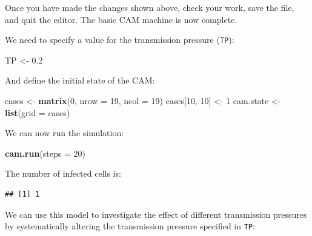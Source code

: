 \documentclass[12pt,a4paper]{book}
\newenvironment{Shaded}{\begin{snugshade}}{\end{snugshade}}
\newcommand{\KeywordTok}[1]{\textcolor[rgb]{0.13,0.29,0.53}{\textbf{#1}}}
\newcommand{\DataTypeTok}[1]{\textcolor[rgb]{0.13,0.29,0.53}{#1}}
\newcommand{\DecValTok}[1]{\textcolor[rgb]{0.00,0.00,0.81}{#1}}
\newcommand{\FloatTok}[1]{\textcolor[rgb]{0.00,0.00,0.81}{#1}}
\newcommand{\StringTok}[1]{\textcolor[rgb]{0.31,0.60,0.02}{#1}}
\newcommand{\OperatorTok}[1]{\textcolor[rgb]{0.81,0.36,0.00}{\textbf{#1}}}
\newcommand{\NormalTok}[1]{#1}
\theoremstyle{definition}
\theoremstyle{definition}
\theoremstyle{definition}
\theoremstyle{remark}
\begin{document}
Once you have made the changes shown above, check your work, save the
file, and quit the editor. The basic CAM machine is now complete.

We need to specify a value for the transmission pressure (\texttt{TP}):

\begin{Shaded}
\begin{Highlighting}[]
\NormalTok{TP <-}\StringTok{ }\FloatTok{0.2}
\end{Highlighting}
\end{Shaded}

And define the initial state of the CAM:

\begin{Shaded}
\begin{Highlighting}[]
\NormalTok{cases <-}\StringTok{ }\KeywordTok{matrix}\NormalTok{(}\DecValTok{0}\NormalTok{, }\DataTypeTok{nrow =} \DecValTok{19}\NormalTok{, }\DataTypeTok{ncol =} \DecValTok{19}\NormalTok{)}
\NormalTok{cases[}\DecValTok{10}\NormalTok{, }\DecValTok{10}\NormalTok{] <-}\StringTok{ }\DecValTok{1}
\NormalTok{cam.state <-}\StringTok{ }\KeywordTok{list}\NormalTok{(}\DataTypeTok{grid =}\NormalTok{ cases)}
\end{Highlighting}
\end{Shaded}

We can now run the simulation:

\begin{Shaded}
\begin{Highlighting}[]
\KeywordTok{cam.run}\NormalTok{(}\DataTypeTok{steps =} \DecValTok{20}\NormalTok{)}
\end{Highlighting}
\end{Shaded}

The number of infected cells is:

\begin{Shaded}
\end{Shaded}

\begin{verbatim}
## [1] 1
\end{verbatim}

We can use this model to investigate the effect of different
transmission pressures by systematically altering the transmission
pressure specified in \texttt{TP}:
\end{document}
